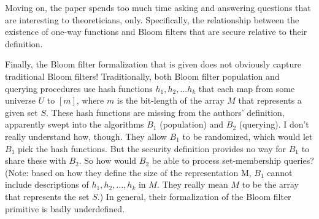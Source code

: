 Moving on, the paper spends too much time asking and answering questions that are interesting to theoreticians, only.  Specifically, the relationship between the existence of one-way functions and Bloom filters that are secure relative to their definition.


Finally, the Bloom filter formalization that is given does not obviously capture traditional Bloom filters!  Traditionally, both Bloom filter population and querying procedures use hash functions $h_1,h_2,...h_k$ that each map from some universe $U$ to $[m]$, where $m$ is the bit-length of the array $M$ that represents a given set $S$.  These hash functions are missing from the authors’ definition, apparently swept into the algorithms $B_1$ (population) and $B_2$ (querying).  I don’t really understand how, though. They allow $B_1$ to be randomized, which would let $B_1$ pick the hash functions.  But the security definition provides no way for $B_1$ to share these with $B_2$.  So how would $B_2$ be able to process set-membership queries?  (Note: based on how they define the size of the representation M, $B_1$ cannot include descriptions of $h_1, h_2, \ldots , h_k$ in $M$.  They really mean $M$ to be the array that represents the set $S$.)  In general, their formalization of the Bloom filter primitive is badly underdefined.


